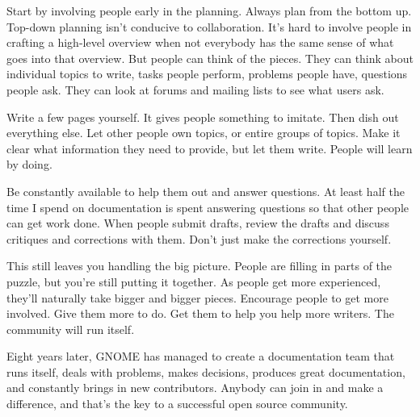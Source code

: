 Start by involving people early in the planning. Always plan from the
bottom up. Top-down planning isn't conducive to collaboration. It's
hard to involve people in crafting a high-level overview when not
everybody has the same sense of what goes into that overview. But
people can think of the pieces. They can think about individual topics
to write, tasks people perform, problems people have, questions people
ask. They can look at forums and mailing lists to see what users ask.

Write a few pages yourself. It gives people something to imitate. Then
dish out everything else. Let other people own topics, or entire groups
of topics. Make it clear what information they need to provide, but let
them write. People will learn by doing.

Be constantly available to help them out and answer questions. At least
half the time I spend on documentation is spent answering questions so
that other people can get work done. When people submit drafts, review
the drafts and discuss critiques and corrections with them. Don't just
make the corrections yourself.

This still leaves you handling the big picture. People are filling in
parts of the puzzle, but you're still putting it together. As people
get more experienced, they'll naturally take bigger and bigger pieces.
Encourage people to get more involved. Give them more to do. Get them
to help you help more writers. The community will run itself.

Eight years later, GNOME has managed to create a documentation team
that runs itself, deals with problems, makes decisions, produces great
documentation, and constantly brings in new contributors. Anybody can
join in and make a difference, and that's the key to a successful open
source community.
